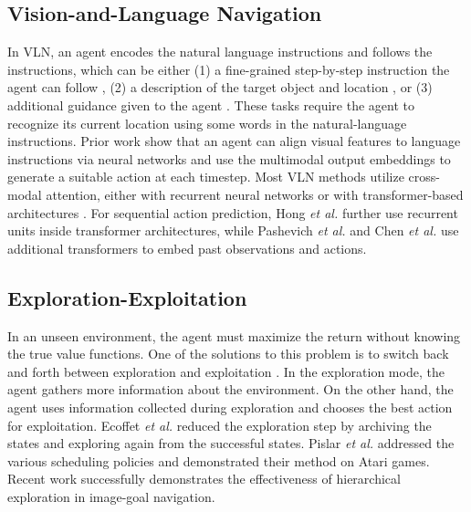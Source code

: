 \documentclass[10pt,twocolumn,letterpaper]{article}
\begin{document}
\subsection{Vision-and-Language Navigation}
\vspace{-0.1cm}
In VLN, an agent encodes the natural language instructions and follows the instructions,
which can be either (1) a fine-grained step-by-step instruction the agent can follow \cite{anderson2018vision, rxr, chen2019touchdown}, (2) a description of the target object
and location \cite{qi2020reverie,zhu2021soon}, or (3) additional guidance given to the agent \cite{nguyen2019hanna, thomason2020vision}. These tasks require the agent to recognize its current location using some words in the natural-language instructions. Prior work \cite{anderson2018vision, fried2018speaker, guhur2021airbert, li2019robust, lu2019vilbert} show that an agent can align visual features to language instructions via neural networks and use the multimodal output embeddings to generate a suitable action at each timestep.
Most VLN methods utilize cross-modal attention, either with recurrent neural networks \cite{anderson2018vision, fried2018speaker}
or with transformer-based architectures \cite{li2019robust, lu2019vilbert, guhur2021airbert}. For sequential action prediction,
Hong \textit{et al.} \cite{hong2021vln} further use recurrent units inside transformer architectures, while Pashevich \textit{et al.} \cite{pashevich2021episodic} and
Chen \textit{et al.} \cite{chen2021history} use additional transformers to embed past observations and actions.
\vspace{-0.1cm}

\vspace{-1.0cm}
\subsection{Exploration-Exploitation}
\vspace{-0.15cm}
\font=2.0pt
In an unseen environment, the agent must maximize the return without knowing the true value functions.
One of the solutions to this problem is to switch back and forth between exploration and exploitation \cite{march1991exploration}. In the exploration mode, the agent gathers more information about the environment. On the other hand, the agent uses information collected during exploration and chooses the best action for exploitation. Ecoffet \textit{et al.} \cite{goexplore} reduced the exploration step by archiving the states and exploring again from the successful states. 
Pislar \textit{et al.} \cite{pislar2022when} addressed the various scheduling policies and demonstrated their method on Atari games.
Recent work \cite{chaplot2020Learning, NRNS} successfully demonstrates the effectiveness of hierarchical exploration in image-goal navigation.
\end{document}
